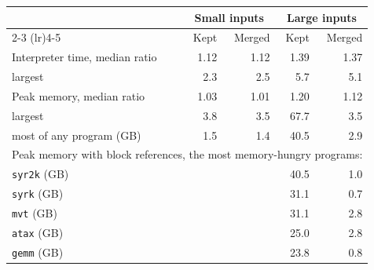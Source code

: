 \begin{tabular}{lrrrr}
\toprule
 & \multicolumn{2}{c}{Small inputs} & \multicolumn{2}{c}{Large inputs} \\
\cmidrule(lr){2-3} \cmidrule(lr){4-5}
 & Kept & Merged & Kept & Merged \\
\midrule
Interpreter time, median ratio & 1.12 & 1.12 & 1.39 & 1.37 \\
\quad largest & 2.3 & 2.5 & 5.7 & 5.1 \\
Peak memory, median ratio & 1.03 & 1.01 & 1.20 & 1.12 \\
\quad largest & 3.8 & 3.5 & 67.7 & 3.5 \\
\quad most of any program (GB) & 1.5 & 1.4 & 40.5 & 2.9 \\
\midrule
\multicolumn{5}{l}{Peak memory with block references, the most memory-hungry programs:} \\
\quad\texttt{syr2k} (GB) &  &  & 40.5 & 1.0 \\
\quad\texttt{syrk} (GB) &  &  & 31.1 & 0.7 \\
\quad\texttt{mvt} (GB) &  &  & 31.1 & 2.8 \\
\quad\texttt{atax} (GB) &  &  & 25.0 & 2.8 \\
\quad\texttt{gemm} (GB) &  &  & 23.8 & 0.8 \\
\bottomrule
\end{tabular}
